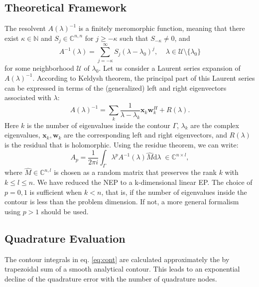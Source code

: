 \documentclass[11pt,letterpaper]{article}
\newcommand{\diff}{\mathrm{d}}
\begin{document}
\subsection{Theoretical Framework}
The resolvent $A(\lambda)^{-1}$ is a finitely meromorphic function, meaning that there exist $\kappa\in\mathbb{N}$ and $S_j\in \mathbb{C}^{n,n}$ for $j\geq -\kappa$ such that $S_{-\kappa}\neq 0$, and 
\begin{equation}\label{eq:Ainv}
A^{-1}(\lambda)=\sum\limits_{j=-\kappa}^{\infty} S_j (\lambda-\lambda_0)^j,\;\;
\;\; \lambda \in \mathcal{U} \setminus \lbrace\lambda_0 \rbrace 
\end{equation}
for some neighborhood $\mathcal{U}$ of $\lambda_0$. Let us consider a Laurent series expansion of $A(\lambda)^{-1}$. According to Keldysh theorem, \citep{keldysh1951characteristic, beyn_integral_2012} the principal part of this Laurent series can be expressed in terms of the (generalized) left and right eigenvectors associated with $\lambda$:
\begin{equation}
\label{eq:Keldysh}
A(\lambda)^{-1} = \sum\limits_{k}\frac{1}{\lambda-\lambda_k}\mathbf{x}_k\mathbf{w}_k^H + R(\lambda).
\end{equation}
Here $k$ is the number of eigenvalues inside the contour $\Gamma$, $\lambda_k$ are the complex eigenvalues, $\mathbf{x}_k, \mathbf{w}_k$ are the corresponding left and right eigenvectors, and $R(\lambda)$ is the residual that is holomorphic. Using the residue theorem, we can write: 
\begin{equation}\label{eq:cont}
A_{p} = \frac{1}{2\pi i}\int_{\Gamma}\lambda^p A^{-1}(\lambda)\hat{M} \diff\lambda \;\in\mathbb{C}^{n \times l},
\end{equation}
where $\hat{M} \in \mathbb{C}^{n,l}$ is chosen as a random matrix that preserves the rank $k$ with $k \leq l \leq n$. We have reduced the NEP to a k-dimensional linear EP. The choice of $p=0,1$ is sufficient when $k<n$, that is, if the number of eigenvalues inside the contour is less than the problem dimension. If not, a more general formalism using $p > 1$ should be used. \citep{beyn_integral_2012}

\subsection{Quadrature Evaluation}
The contour integrals in eq. \ref{eq:cont} are calculated approximately the by trapezoidal sum of a smooth analytical contour. This leads to an exponential decline of the quadrature error with the number of quadrature nodes.
\end{document}

